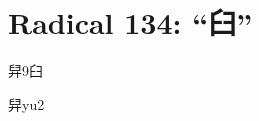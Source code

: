 
\section*{Radical 134: ``⾅''}

\begin{Entry}{舁}{9}{⾅}
  \begin{Phonetics}{舁}{yu2}
  \end{Phonetics}
\end{Entry}


